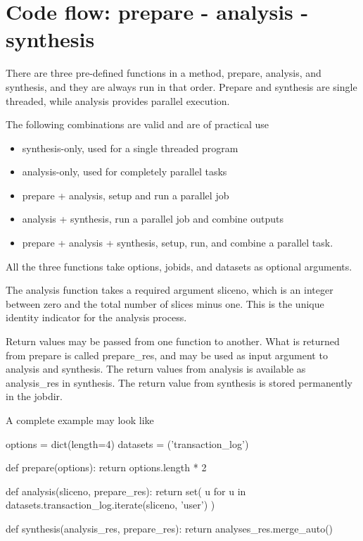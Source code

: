 \newpage
\section{Code flow:  prepare - analysis - synthesis}

There are three pre-defined functions in a method, prepare, analysis,
and synthesis, and they are always run in that order.  Prepare and
synthesis are single threaded, while analysis provides parallel
execution.

The following combinations are valid and are of practical use
\begin{itemize}
\item synthesis-only, used for a single threaded program
\item analysis-only, used for completely parallel tasks
\item prepare + analysis, setup and run a parallel job
\item analysis + synthesis, run a parallel job and combine outputs
\item prepare + analysis + synthesis, setup, run, and combine a
  parallel task.
\end{itemize}

All the three functions take options, jobids, and datasets as optional
arguments.

The analysis function takes a required argument sliceno, which is an
integer between zero and the total number of slices minus one.  This
is the unique identity indicator for the analysis process.

Return values may be passed from one function to another.  What is
returned from prepare is called prepare\_res, and may be used as input
argument to analysis and synthesis.  The return values from analysis
is available as analysis\_res in synthesis.  The return value from
synthesis is stored permanently in the jobdir.

A complete example may look like

\begin{python}
options = dict(length=4)
datasets = ('transaction_log')

def prepare(options):
  return options.length * 2

def analysis(sliceno, prepare_res):
  return set(
    u for u in datasets.transaction_log.iterate(sliceno, 'user')
  )

def synthesis(analysis_res, prepare_res):
   return analyses_res.merge_auto()
\end{python}


